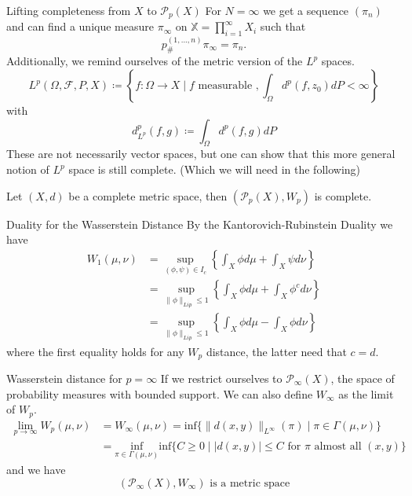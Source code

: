 \documentclass[10pt]{beamer}
\theoremstyle{reminder}
\begin{document}
\begin{frame}{Lifting completeness from $X$ to $\mathcal{P}_p(X)$}
    For $N=\infty$ we get a sequence $(\pi_n)$ and can find a unique measure $\pi_\infty$ on $\mathbb{X} = \prod_{i = 1}^\infty X_i$ such that $$p^{(1,...,n)}_{\#} \pi_\infty = \pi_n.$$
    Additionally, we remind ourselves of the metric version of the $L^p$ spaces. 
        $$L^p(\Omega,\mathcal{F}, P, X) \coloneqq \left\{ f : \Omega \rightarrow X \mid f \text{ measurable }, \int_\Omega d^p(f,z_0) d P < \infty \right\}$$ with$$d_{L^p}^p(f,g) \coloneqq \int_\Omega d^p(f,g) dP$$
        These are not necessarily vector spaces, but one can show that this more general notion of $L^p$ space is still complete. (Which we will need in the following)
    \begin{theorem}
        Let $(X,d)$ be a complete metric space, then $(\mathcal{P}_p(X), W_p)$ is complete.
    \end{theorem}
\end{frame}


\begin{frame}{Duality for the Wasserstein Distance}
    By the Kantorovich-Rubinstein Duality we have \begin{align*} W_1(\mu,\nu) &= \sup_{(\phi,\psi) \in I_c} \left\{ \int_X \phi d\mu + \int_X \psi d\nu \right\} \\ &= \sup_{\|\phi\|_{Lip} \leq 1} \left\{\int_X \phi d\mu + \int_X \phi^c d\nu  \right\} 
       \\ &= \sup_{\|\phi\|_{Lip} \leq 1} \left\{\int_X \phi d\mu - \int_X \phi d\nu  \right\} \end{align*}
       where the first equality holds for any $W_p$ distance, the latter need that $c = d$.
\end{frame}


\begin{frame}{Wasserstein distance for $p = \infty$}
    If we restrict ourselves to $\mathcal{P}_\infty(X)$, the space of probability measures with bounded support. We can also define $W_\infty$ as the limit of $W_p$.
    \begin{align*}\lim_{p \to \infty} W_p(\mu,\nu) &= W_\infty(\mu,\nu) =\text{inf}\{\|d(x,y)\|_{L^\infty}(\pi) \mid \pi \in \Gamma(\mu,\nu)\} \\
    &= \underset{\pi \in \Gamma(\mu,\nu)}{\text{inf}}\text{inf}\{C \geq 0 \mid |d(x,y)| \leq C \text{ for } \pi \text{ almost all } (x,y)\} \end{align*} 
    and we have $$(\mathcal{P}_\infty(X), W_\infty) \text{ is a metric space}$$ 
\end{frame}



\end{document}
